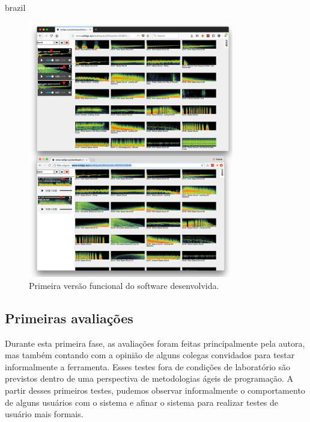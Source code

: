 \begin{otherlanguage*}{brazil}
\begin{figure}
\centering
\includegraphics[width=0.8\textwidth]{pictures/cap4/audioquery_browsers}
\caption{\label{audiquery}Primeira versão funcional do software desenvolvida.}
\label{fig:audioquery}
\end{figure}

\subsection{Primeiras avaliações}

Durante esta primeira fase, as avaliações foram feitas principalmente pela autora, mas também contando com a opinião de alguns colegas convidados para testar informalmente a ferramenta. Esses testes fora de condições de laboratório são previstos dentro de uma perspectiva de metodologias ágeis de programação. A partir desses primeiros testes, pudemos observar informalmente o comportamento de alguns usuários com o sistema e afinar o sistema para realizar testes de usuário mais formais. 





\end{otherlanguage*}
